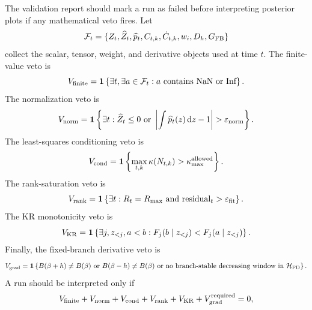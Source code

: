 \documentclass[11pt]{article}
\numberwithin{equation}{section}
\newcommand{\dd}{\,\mathrm d}
\newcommand{\ind}{\mathbf 1}
\begin{document}
The validation report should mark a run as failed before interpreting posterior
plots if any mathematical veto fires.  Let
\begin{equation}
    \mathcal F_t
    =
    \{
    Z_t,\widehat Z_t,
    \widehat p_t,
    C_{t,k},
    \dot C_{t,k},
    w_i,
    D_h,
    G_{\rm FB}
    \}
    \label{eq:p27-r1}
\end{equation}
collect the scalar, tensor, weight, and derivative objects used at time \(t\).
The finite-value veto is
\begin{equation}
    V_{\rm finite}
    =
    \ind\left\{
    \exists t,\exists a\in\mathcal F_t:
    a\text{ contains NaN or Inf}
    \right\}.
    \label{eq:p27-r2}
\end{equation}
The normalization veto is
\begin{equation}
    V_{\rm norm}
    =
    \ind\left\{
    \exists t:
    \widehat Z_t\le0
    \text{ or }
    \left|\int \widehat p_t(z)\dd z-1\right|>\varepsilon_{\rm norm}
    \right\}.
    \label{eq:p27-r3}
\end{equation}
The least-squares conditioning veto is
\begin{equation}
    V_{\rm cond}
    =
    \ind\left\{
    \max_{t,k}\kappa(N_{t,k})
    >
    \kappa_{\rm max}^{\rm allowed}
    \right\}.
    \label{eq:p27-r4}
\end{equation}
The rank-saturation veto is
\begin{equation}
    V_{\rm rank}
    =
    \ind\left\{
    \exists t:
    R_t=R_{\rm max}
    \text{ and }
    {\rm residual}_t>\varepsilon_{\rm fit}
    \right\}.
    \label{eq:p27-r5}
\end{equation}
The KR monotonicity veto is
\begin{equation}
    V_{\rm KR}
    =
    \ind\left\{
    \exists j,z_{<j},a<b:
    F_j(b\mid z_{<j})<F_j(a\mid z_{<j})
    \right\}.
    \label{eq:p27-r6}
\end{equation}
Finally, the fixed-branch derivative veto is
\begin{equation}
    V_{\rm grad}
    =
    \ind\left\{
    B(\beta+h)\ne B(\beta)
    \text{ or }
    B(\beta-h)\ne B(\beta)
    \text{ or no branch-stable decreasing window in }\mathcal H_{\rm FD}
    \right\}.
    \label{eq:p27-r7}
\end{equation}
A run should be interpreted only if
\begin{equation}
    V_{\rm finite}
    +V_{\rm norm}
    +V_{\rm cond}
    +V_{\rm rank}
    +V_{\rm KR}
    +V_{\rm grad}^{\rm required}
    =
    0,
    \label{eq:p27-r8}
\end{equation}
\end{document}
